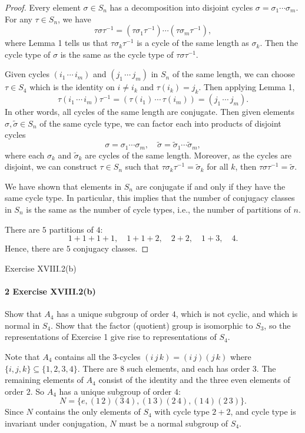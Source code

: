 \documentclass[12pt]{article}
\newlength{\myparskip}
\newenvironment{fullbox}{\begin{lrbox}{\savefullbox}\begin{minipage}{\dimexpr\textwidth-2\fboxsep\relax}\setlength{\parskip}{\myparskip}}{\end{minipage}\end{lrbox}\framebox[\textwidth]{\usebox{\savefullbox}}}
\newenvironment{pbox}[1][]{\begin{fullbox}\ifx#1\empty\else\paragraph{#1}\fi}{\end{fullbox}}
\newcommand{\<}{\langle}
\renewcommand{\>}{\rangle}
\theoremstyle{definition}
\begin{document}
\begin{proof}
    Every element $\sigma \in S_n$ has a decomposition into disjoint cycles $\sigma = \sigma_1 \cdots \sigma_m$. For any $\tau \in S_n$, we have
    \[
        \tau\sigma\tau^{-1} = (\tau\sigma_1\tau^{-1}) \cdots (\tau\sigma_m\tau^{-1}),
    \]
    where Lemma 1 tells us that $\tau\sigma_k\tau^{-1}$ is a cycle of the same length as $\sigma_k$. Then the cycle type of $\sigma$ is the same as the cycle type of $\tau\sigma\tau^{-1}$.

    Given cycles $(i_1 \, \cdots \, i_m)$ and $(j_1 \, \cdots \, j_m)$ in $S_n$ of the same length, we can choose $\tau \in S_4$ which is the identity on $i \ne i_k$ and $\tau(i_k) = j_k$. Then applying Lemma 1,
    \[
        \tau(i_1 \, \cdots \, i_m)\tau^{-1}
            = (\tau(i_1) \, \cdots \, \tau(i_m))
            = (j_1 \, \cdots \, j_m).
    \]
    In other words, all cycles of the same length are conjugate. Then given elements $\sigma, \tilde{\sigma} \in S_n$ of the same cycle type, we can factor each into products of disjoint cycles
    \[
        \sigma = \sigma_1 \cdots \sigma_m, \quad \tilde{\sigma} = \tilde{\sigma}_1 \cdots \tilde{\sigma}_m,
    \]
    where each $\sigma_k$ and $\tilde{\sigma}_k$ are cycles of the same length. Moreover, as the cycles are disjoint, we can construct $\tau \in S_n$ such that $\tau\sigma_k\tau^{-1} = \tilde{\sigma}_k$ for all $k$, then $\tau\sigma\tau^{-1} = \tilde{\sigma}$.

    We have shown that elements in $S_n$ are conjugate if and only if they have the same cycle type. In particular, this implies that the number of conjugacy classes in $S_n$ is the same as the number of cycle types, i.e., the number of partitions of $n$.

    There are $5$ partitions of $4$:
    \[
        1 + 1 + 1 + 1, \quad 1 + 1 + 2, \quad 2 + 2, \quad 1 + 3, \quad 4.
    \]
    Hence, there are $5$ conjugacy classes.
\end{proof}



\newpage
\begin{pbox}[2 Exercise XVIII.2(b)]
    Show that $A_4$ has a unique subgroup of order $4$, which is not cyclic, and which is normal in $S_4$. Show that the factor (quotient) group is isomorphic to $S_3$, so the representations of Exercise 1 give rise to representations of $S_4$.
\end{pbox}

Note that $A_4$ contains all the $3$-cycles $(i \, j \, k) = (i \, j)(j \, k)$ where $\{i, j, k\} \subseteq \{1, 2, 3, 4\}$. There are $8$ such elements, and each has order $3$. The remaining elements of $A_4$ consist of the identity and the three even elements of order $2$. So $A_4$ has a unique subgroup of order $4$:
\[
    N = \{e, (1 \, 2)(3 \, 4), (1 \, 3)(2 \, 4), (1 \, 4)(2 \, 3)\}.
\]
Since $N$ contains the only elements of $S_4$ with cycle type $2 + 2$, and cycle type is invariant under conjugation, $N$ must be a normal subgroup of $S_4$.
\end{document}
